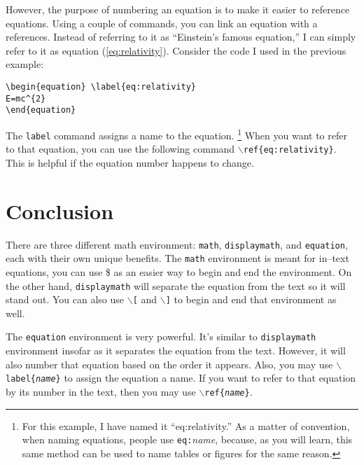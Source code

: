 \documentclass{article}
\begin{document}
However, the purpose of numbering an equation is to make it easier to reference equations. Using a couple of commands, you can link an equation with a references. Instead of referring to it as ``Einstein's famous equation,'' I can simply refer to it as equation (\ref{eq:relativity}). Consider the code I used in the previous example:
\begin{verbatim}
\begin{equation} \label{eq:relativity}
E=mc^{2}
\end{equation}
\end{verbatim}
The \texttt{label} command assigns a name to the equation. \footnote{For this example, I have named it ``eq:relativity.'' As a matter of convention, when naming equations, people use \texttt{eq:}\textit{name}, because, as you will learn, this same method can be used to name tables or figures for the same reason.} When you want to refer to that equation, you can use the following command \texttt{$\backslash$ref\{eq:relativity\}}. This is helpful if the equation number happens to change.

\section{Conclusion}

There are three different math environment: \texttt{math}, \texttt{displaymath}, and \texttt{equation}, each with their own unique benefits. The \texttt{math} environment is meant for in--text equations, you can use \$ as an easier way to begin and end the environment. On the other hand, \texttt{displaymath} will separate the equation from the text so it will stand out. You can also use \texttt{$\backslash$[} and \texttt{$\backslash$]} to begin and end that environment as well.

The \texttt{equation} environment is very powerful. It's similar to \texttt{displaymath} environment insofar as it separates the equation from the text. However, it will also number that equation based on the order it appears. Also, you may use \texttt{$\backslash$label\{\textit{name}\}} to assign the equation a name. If you want to refer to that equation by its number in the text, then you may use \texttt{$\backslash$ref\{\textit{name}\}}.
\end{document}
